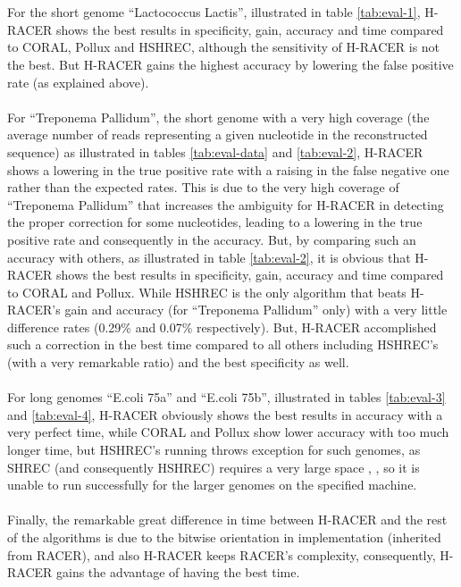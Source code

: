 \documentclass{llncs}
\begin{document}
\\\\
For the short genome \enquote{Lactococcus Lactis}, illustrated in table \ref{tab:eval-1}, H-RACER shows the best results in specificity, gain, accuracy and time compared to CORAL, Pollux and HSHREC, although the sensitivity of H-RACER is not the best. But H-RACER gains the highest accuracy by lowering the false positive rate (as explained above).
\\\\ 
For \enquote{Treponema Pallidum}, the short genome with a very high coverage (the average number of reads representing a given nucleotide in the reconstructed sequence) as illustrated in tables \ref{tab:eval-data} and \ref{tab:eval-2}, H-RACER shows a lowering in the true positive rate with a raising in the false negative one rather than the expected rates. This is due to the very high coverage of \enquote{Treponema Pallidum} that increases the ambiguity for H-RACER in detecting the proper correction for some nucleotides, leading to a lowering in the true positive rate and consequently in the accuracy. But, by comparing such an accuracy with others, as illustrated in table \ref{tab:eval-2}, it is obvious that H-RACER shows the best results in specificity, gain, accuracy and time compared to CORAL and Pollux. While HSHREC is the only algorithm that beats H-RACER's gain and accuracy (for \enquote{Treponema Pallidum} only) with a very little difference rates (0.29\% and 0.07\% respectively). But, H-RACER accomplished such a correction in the best time compared to all others including HSHREC's (with a very remarkable ratio) and the best specificity as well.
\\\\
For long genomes \enquote{E.coli 75a} and \enquote{E.coli 75b}, illustrated in tables \ref{tab:eval-3} and \ref{tab:eval-4}, H-RACER obviously shows the best results in accuracy with a very perfect time, while CORAL and Pollux show lower accuracy with too much longer time, but HSHREC's running throws exception for such genomes, as SHREC (and consequently HSHREC) requires a very large space \cite{Racer}, \cite{HShrec}, so it is unable to run successfully for the larger genomes on the specified machine.
\\\\ 
Finally, the remarkable great difference in time between H-RACER and the rest of the algorithms is due to the bitwise orientation in implementation (inherited from RACER), and also H-RACER keeps RACER's complexity, consequently, H-RACER gains the advantage of having the best time. 
\end{document}
